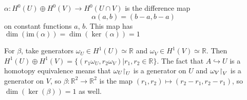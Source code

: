 \begin{xmpl}
$\alpha : H^0(U) \oplus H^0(V) \to H^0(U \cap V)$ is the difference
  map
$$
\alpha(a, b) = (b - a, b - a)
$$
on constant functions $a$, $b$. This map has
$\dim(\mathrm{im}(\alpha)) = \dim(\ker(\alpha)) = 1$

For $\beta$, take generators
$\omega_U \in H^1(U) \simeq \mathbb{R}$ and
$\omega_V \in H^1(V) \simeq \mathbb{R}$. Then
$ H^1(U) \oplus H^1(V)
= \{(r_1 \omega_U, r_2 \omega_V) | r_1, r_2 \in \mathbb{R}\}$.
The fact that $A \hookrightarrow U$ is a homotopy equivalence means
that
$\omega_U \mathord{\upharpoonright}_U$ is a generator on $U$ and
$\omega_V \mathord{\upharpoonright}_V$ is a generator on $V$, so
$\beta : \mathbb{R}^2 \to \mathbb{R}^2$ is the map
$(r_1, r_2) \mapsto (r_2 - r_1, r_2 - r_1)$, so
$\dim(\ker(\beta)) = 1$ as well.
\end{xmpl}
